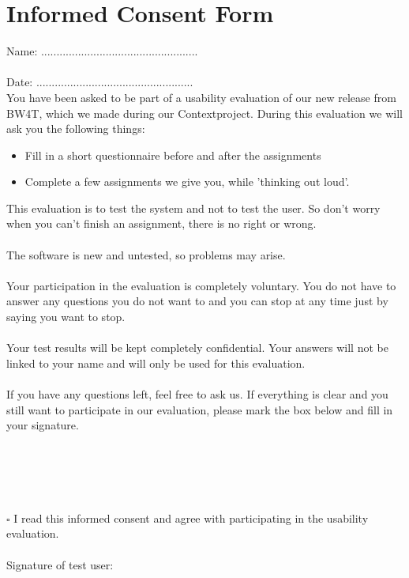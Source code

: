 \section*{Informed Consent Form}

Name: ................................................... \\\\
Date: ................................................... \\

You have been asked to be part of a usability evaluation of our new release from BW4T, which we made during our Contextproject. During this evaluation we will ask you the following things:

\begin{itemize}
\item Fill in a short questionnaire before and after the assignments
\item Complete a few assignments we give you, while 'thinking out loud'.
\end{itemize}

This evaluation is to test the system and not to test the user. So don’t worry when you can’t finish an assignment, there is no right or wrong. \\
\\
The software is new and untested, so problems may arise. \\
\\
Your participation in the evaluation is completely voluntary. You do not have to answer any questions you do not want to and you can stop at any time just by saying you want to stop. \\
\\
Your test results will be kept completely confidential. Your answers will not be linked to your name and will only be used for this evaluation. \\
\\
If you have any questions left, feel free to ask us. If everything is clear and you still want to participate in our evaluation, please mark the box below and fill in your signature. \\
\\
\\
\\
\\
\\
$\square$ I read this informed consent and agree with participating in the usability evaluation. \\
\\
Signature of test user: \\
\pagebreak